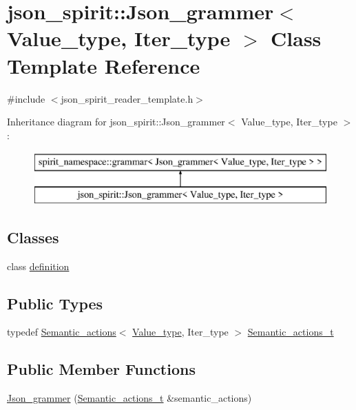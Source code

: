 \hypertarget{classjson__spirit_1_1_json__grammer}{}\section{json\+\_\+spirit\+:\+:Json\+\_\+grammer$<$ Value\+\_\+type, Iter\+\_\+type $>$ Class Template Reference}
\label{classjson__spirit_1_1_json__grammer}


{\ttfamily \#include $<$json\+\_\+spirit\+\_\+reader\+\_\+template.\+h$>$}

Inheritance diagram for json\+\_\+spirit\+:\+:Json\+\_\+grammer$<$ Value\+\_\+type, Iter\+\_\+type $>$\+:\begin{figure}[H]
\begin{center}
\leavevmode
\includegraphics[height=2.000000cm]{classjson__spirit_1_1_json__grammer}
\end{center}
\end{figure}
\subsection*{Classes}
\begin{DoxyCompactItemize}
\item 
class \hyperlink{classjson__spirit_1_1_json__grammer_1_1definition}{definition}
\end{DoxyCompactItemize}
\subsection*{Public Types}
\begin{DoxyCompactItemize}
\item 
typedef \hyperlink{classjson__spirit_1_1_semantic__actions}{Semantic\+\_\+actions}$<$ \hyperlink{namespacejson__spirit_aeaad57c912e0370a76f60cd510ad3d74}{Value\+\_\+type}, Iter\+\_\+type $>$ \hyperlink{classjson__spirit_1_1_json__grammer_af002d620720009cf1d1a8b7bdebcd704}{Semantic\+\_\+actions\+\_\+t}
\end{DoxyCompactItemize}
\subsection*{Public Member Functions}
\begin{DoxyCompactItemize}
\item 
\hyperlink{classjson__spirit_1_1_json__grammer_a366061eedf4a7f49161418491c09aa9d}{Json\+\_\+grammer} (\hyperlink{classjson__spirit_1_1_json__grammer_af002d620720009cf1d1a8b7bdebcd704}{Semantic\+\_\+actions\+\_\+t} \&semantic\+\_\+actions)
\end{DoxyCompactItemize}
